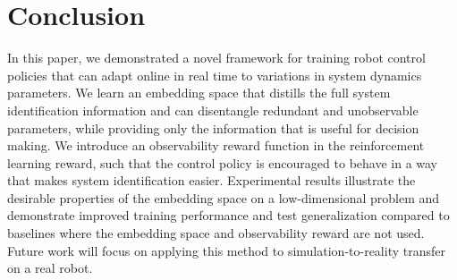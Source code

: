 \documentclass{article}
\begin{document}
\section{Conclusion}
In this paper, we demonstrated a novel framework for training robot control policies
that can adapt online in real time to variations in system dynamics parameters.
We learn an embedding space that distills the full system identification information
and can disentangle redundant and unobservable parameters, while providing only the information that is useful for decision making.
We introduce an observability reward function in the reinforcement learning reward,
such that the control policy is encouraged to behave in a way that makes system identification easier.
Experimental results illustrate the desirable properties of the embedding space on a low-dimensional problem
and demonstrate improved training performance and test generalization compared to baselines
where the embedding space and observability reward are not used.
Future work will focus on applying this method to simulation-to-reality transfer on a real robot.

\clearpage
\acknowledgments{}
{}
\end{document}
